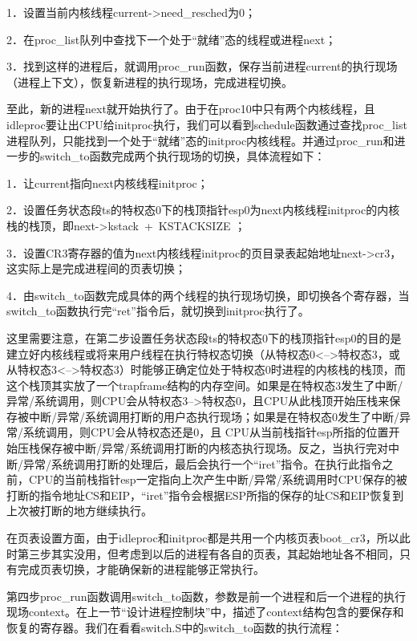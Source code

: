 1．设置当前内核线程current-\textgreater{}need\_resched为0；

2．在proc\_list队列中查找下一个处于``就绪''态的线程或进程next；

3．找到这样的进程后，就调用proc\_run函数，保存当前进程current的执行现场（进程上下文），恢复新进程的执行现场，完成进程切换。

至此，新的进程next就开始执行了。由于在proc10中只有两个内核线程，且idleproc要让出CPU给initproc执行，我们可以看到schedule函数通过查找proc\_list进程队列，只能找到一个处于``就绪''态的initproc内核线程。并通过proc\_run和进一步的switch\_to函数完成两个执行现场的切换，具体流程如下：

1．让current指向next内核线程initproc；

2．设置任务状态段ts的特权态0下的栈顶指针esp0为next内核线程initproc的内核栈的栈顶，即next-\textgreater{}kstack~+~KSTACKSIZE
；

3．设置CR3寄存器的值为next内核线程initproc的页目录表起始地址next-\textgreater{}cr3，这实际上是完成进程间的页表切换；

4．由switch\_to函数完成具体的两个线程的执行现场切换，即切换各个寄存器，当switch\_to函数执行完``ret''指令后，就切换到initproc执行了。

这里需要注意，在第二步设置任务状态段ts的特权态0下的栈顶指针esp0的目的是建立好内核线程或将来用户线程在执行特权态切换（从特权态0\textless{}--\textgreater{}特权态3，或从特权态3\textless{}--\textgreater{}特权态3）时能够正确定位处于特权态0时进程的内核栈的栈顶，而这个栈顶其实放了一个trapframe结构的内存空间。如果是在特权态3发生了中断/异常/系统调用，则CPU会从特权态3--\textgreater{}特权态0，且CPU从此栈顶开始压栈来保存被中断/异常/系统调用打断的用户态执行现场；如果是在特权态0发生了中断/异常/系统调用，则CPU会从特权态还是0，且
CPU从当前栈指针esp所指的位置开始压栈保存被中断/异常/系统调用打断的内核态执行现场。反之，当执行完对中断/异常/系统调用打断的处理后，最后会执行一个``iret''指令。在执行此指令之前，CPU的当前栈指针esp一定指向上次产生中断/异常/系统调用时CPU保存的被打断的指令地址CS和EIP，``iret''指令会根据ESP所指的保存的址CS和EIP恢复到上次被打断的地方继续执行。

在页表设置方面，由于idleproc和initproc都是共用一个内核页表boot\_cr3，所以此时第三步其实没用，但考虑到以后的进程有各自的页表，其起始地址各不相同，只有完成页表切换，才能确保新的进程能够正常执行。

第四步proc\_run函数调用switch\_to函数，参数是前一个进程和后一个进程的执行现场context。在上一节``设计进程控制块''中，描述了context结构包含的要保存和恢复的寄存器。我们在看看switch.S中的switch\_to函数的执行流程：

